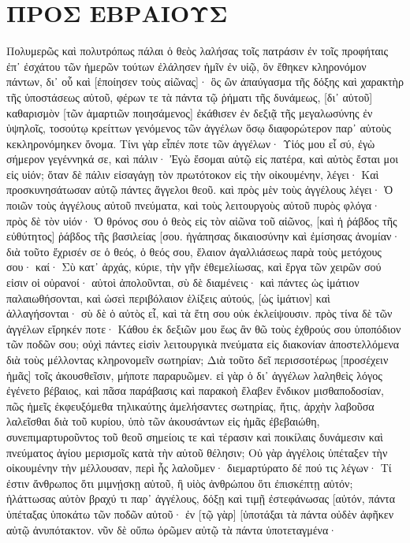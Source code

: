\section{ΠΡΟΣ ΕΒΡΑΙΟΥΣ}
Πολυμερῶς καὶ πολυτρόπως πάλαι ὁ θεὸς λαλήσας τοῖς πατράσιν ἐν τοῖς προφήταις 
ἐπ᾽ ἐσχάτου τῶν ἡμερῶν τούτων ἐλάλησεν ἡμῖν ἐν υἱῷ, ὃν ἔθηκεν κληρονόμον πάντων, δι᾽ οὗ καὶ [ἐποίησεν τοὺς αἰῶνας]· 
ὃς ὢν ἀπαύγασμα τῆς δόξης καὶ χαρακτὴρ τῆς ὑποστάσεως αὐτοῦ, φέρων τε τὰ πάντα τῷ ῥήματι τῆς δυνάμεως, [δι᾽ αὑτοῦ] καθαρισμὸν [τῶν ἁμαρτιῶν ποιησάμενος] ἐκάθισεν ἐν δεξιᾷ τῆς μεγαλωσύνης ἐν ὑψηλοῖς, 
τοσούτῳ κρείττων γενόμενος τῶν ἀγγέλων ὅσῳ διαφορώτερον παρ᾽ αὐτοὺς κεκληρονόμηκεν ὄνομα. 
Τίνι γὰρ εἶπέν ποτε τῶν ἀγγέλων· Υἱός μου εἶ σύ, ἐγὼ σήμερον γεγέννηκά σε, καὶ πάλιν· Ἐγὼ ἔσομαι αὐτῷ εἰς πατέρα, καὶ αὐτὸς ἔσται μοι εἰς υἱόν; 
ὅταν δὲ πάλιν εἰσαγάγῃ τὸν πρωτότοκον εἰς τὴν οἰκουμένην, λέγει· Καὶ προσκυνησάτωσαν αὐτῷ πάντες ἄγγελοι θεοῦ. 
καὶ πρὸς μὲν τοὺς ἀγγέλους λέγει· Ὁ ποιῶν τοὺς ἀγγέλους αὐτοῦ πνεύματα, καὶ τοὺς λειτουργοὺς αὐτοῦ πυρὸς φλόγα· 
πρὸς δὲ τὸν υἱόν· Ὁ θρόνος σου ὁ θεὸς εἰς τὸν αἰῶνα τοῦ αἰῶνος, [καὶ ἡ ῥάβδος τῆς εὐθύτητος] ῥάβδος τῆς βασιλείας [σου. 
ἠγάπησας δικαιοσύνην καὶ ἐμίσησας ἀνομίαν· διὰ τοῦτο ἔχρισέν σε ὁ θεός, ὁ θεός σου, ἔλαιον ἀγαλλιάσεως παρὰ τοὺς μετόχους σου· 
καί· Σὺ κατ᾽ ἀρχάς, κύριε, τὴν γῆν ἐθεμελίωσας, καὶ ἔργα τῶν χειρῶν σού εἰσιν οἱ οὐρανοί· 
αὐτοὶ ἀπολοῦνται, σὺ δὲ διαμένεις· καὶ πάντες ὡς ἱμάτιον παλαιωθήσονται, 
καὶ ὡσεὶ περιβόλαιον ἑλίξεις αὐτούς, [ὡς ἱμάτιον] καὶ ἀλλαγήσονται· σὺ δὲ ὁ αὐτὸς εἶ, καὶ τὰ ἔτη σου οὐκ ἐκλείψουσιν. 
πρὸς τίνα δὲ τῶν ἀγγέλων εἴρηκέν ποτε· Κάθου ἐκ δεξιῶν μου ἕως ἂν θῶ τοὺς ἐχθρούς σου ὑποπόδιον τῶν ποδῶν σου; 
οὐχὶ πάντες εἰσὶν λειτουργικὰ πνεύματα εἰς διακονίαν ἀποστελλόμενα διὰ τοὺς μέλλοντας κληρονομεῖν σωτηρίαν; 
Διὰ τοῦτο δεῖ περισσοτέρως [προσέχειν ἡμᾶς] τοῖς ἀκουσθεῖσιν, μήποτε παραρυῶμεν. 
εἰ γὰρ ὁ δι᾽ ἀγγέλων λαληθεὶς λόγος ἐγένετο βέβαιος, καὶ πᾶσα παράβασις καὶ παρακοὴ ἔλαβεν ἔνδικον μισθαποδοσίαν, 
πῶς ἡμεῖς ἐκφευξόμεθα τηλικαύτης ἀμελήσαντες σωτηρίας, ἥτις, ἀρχὴν λαβοῦσα λαλεῖσθαι διὰ τοῦ κυρίου, ὑπὸ τῶν ἀκουσάντων εἰς ἡμᾶς ἐβεβαιώθη, 
συνεπιμαρτυροῦντος τοῦ θεοῦ σημείοις τε καὶ τέρασιν καὶ ποικίλαις δυνάμεσιν καὶ πνεύματος ἁγίου μερισμοῖς κατὰ τὴν αὐτοῦ θέλησιν; 
Οὐ γὰρ ἀγγέλοις ὑπέταξεν τὴν οἰκουμένην τὴν μέλλουσαν, περὶ ἧς λαλοῦμεν· 
διεμαρτύρατο δέ πού τις λέγων· Τί ἐστιν ἄνθρωπος ὅτι μιμνῄσκῃ αὐτοῦ, ἢ υἱὸς ἀνθρώπου ὅτι ἐπισκέπτῃ αὐτόν; 
ἠλάττωσας αὐτὸν βραχύ τι παρ᾽ ἀγγέλους, δόξῃ καὶ τιμῇ ἐστεφάνωσας [αὐτόν, 
πάντα ὑπέταξας ὑποκάτω τῶν ποδῶν αὐτοῦ· ἐν [τῷ γὰρ] [ὑποτάξαι τὰ πάντα οὐδὲν ἀφῆκεν αὐτῷ ἀνυπότακτον. νῦν δὲ οὔπω ὁρῶμεν αὐτῷ τὰ πάντα ὑποτεταγμένα· 
